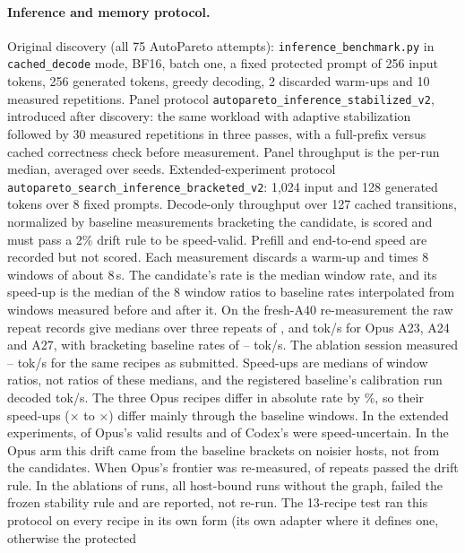\documentclass{article}
\begin{document}
\begin{table}[H]
\caption{Recorded software environment by era. Panel, Pair-A (extended experiments), E1, Opus-test and 13-recipe rows are read from their run records. Other rows are from the provenance audit. $^\dagger$Driver 595.112.07 after the host restart of 2026-11-16 (Appendix~\ref{app:repro}).}\label{tab:env}
\centering\scriptsize
\end{table}

\paragraph{Inference and memory protocol.} Original discovery (all 75 AutoPareto attempts): \texttt{inference\_benchmark.py} in \texttt{cached\_decode} mode, BF16, batch one, a fixed protected prompt of 256 input tokens, 256 generated tokens, greedy decoding, 2 discarded warm-ups and 10 measured repetitions. Panel protocol \texttt{autopareto\_inference\_stabilized\_v2}, introduced after discovery: the same workload with adaptive stabilization followed by 30 measured repetitions in three passes, with a full-prefix versus cached correctness check before measurement. Panel throughput is the per-run median, averaged over seeds. Extended-experiment protocol \texttt{autopareto\_search\_inference\_bracketed\_v2}: 1,024 input and 128 generated tokens over 8 fixed prompts. Decode-only throughput over 127 cached transitions, normalized by baseline measurements bracketing the candidate, is scored and must pass a 2\% drift rule to be speed-valid. Prefill and end-to-end speed are recorded but not scored. Each measurement discards a warm-up and times 8 windows of about 8\,s. The candidate's rate is the median window rate, and its speed-up is the median of the 8 window ratios to baseline rates interpolated from windows measured before and after it. On the fresh-A40 re-measurement the raw repeat records give medians over three repeats of \CROpAbsTwentyThree, \CROpAbsTwentyFour{} and \CROpAbsTwentySeven{} tok/s for Opus A23, A24 and A27, with bracketing baseline rates of \CRPTwoBaseLo--\CRPTwoBaseHi{} tok/s. The ablation session measured \CRIAAbsLo--\CRIAAbsHi{} tok/s for the same recipes as submitted. Speed-ups are medians of window ratios, not ratios of these medians, and the registered baseline's calibration run decoded \CRAgBaseDecode{} tok/s. The three Opus recipes differ in absolute rate by \CROpAbsSpreadPct\%, so their speed-ups (\CROpDecodeLo$\times$ to \CROpDecodeHi$\times$) differ mainly through the baseline windows. In the extended experiments, \CROpUncertain{} of Opus's \CROpValid{} valid results and \CRCxUncertain{} of Codex's \CRCxValid{} were speed-uncertain. In the Opus arm this drift came from the baseline brackets on noisier hosts, not from the candidates. When Opus's frontier was re-measured, \CROpStableRepeats{} of \CROpRepeats{} repeats passed the drift rule. In the ablations \CRIAUnstable{} of \CRIARuns{} runs, all host-bound runs without the graph, failed the frozen stability rule and are reported, not re-run. The 13-recipe test ran this protocol on every recipe in its own form (its own adapter where it defines one, otherwise the protected 
\end{document}
